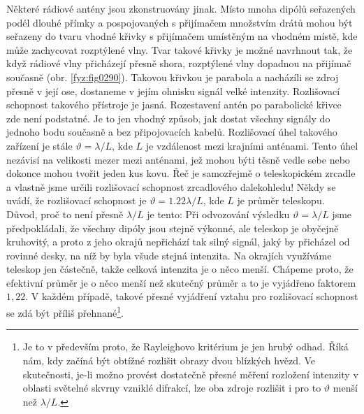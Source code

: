     Některé rádiové antény jsou zkonstruovány jinak. Místo mnoha dipólů seřazených podél dlouhé 
    přímky a pospojovaných s přijímačem množstvím drátů mohou být seřazeny do tvaru vhodné křivky s 
    přijímačem umístěným na vhodném místě, kde může zachycovat rozptýlené vlny. Tvar takové křivky 
    je možné navrhnout tak, že když rádiové vlny přicházejí přesně shora, rozptýlené vlny dopadnou 
    na přijímač současně (obr. \ref{fyz:fig0290}). Takovou křivkou je parabola a nacházíli se zdroj 
    přesně v její ose, dostaneme v jejím ohnisku signál velké intenzity. Rozlišovací schopnost 
    takového přístroje je jasná. Rozestavení antén po parabolické křivce zde není podstatné. Je to 
    jen vhodný způsob, jak dostat všechny signály do jednoho bodu současně a bez připojovacích 
    kabelů. Rozlišovací úhel takového zařízení je stále  \(\vartheta =  \lambda/L\), kde \(L\) je 
    vzdálenost mezi krajními anténami. Tento úhel nezávisí na velikosti mezer mezi anténami, jež 
    mohou býti těsně vedle sebe nebo dokonce mohou tvořit jeden kus kovu. Řeč je samozřejmě o 
    teleskopickém zrcadle a vlastně jsme určili rozlišovací schopnost zrcadlového dalekohledu! 
    Někdy se uvádí, že rozlišovací schopnost je \(\vartheta = \num{1.22}\lambda/L\), kde \(L\) je 
    průměr teleskopu. Důvod, proč to není přesně \(\lambda/L\) je tento: Při odvozování výsledku 
    \(\vartheta = \lambda/L\) jsme předpokládali, že všechny dipóly jsou stejně výkonné, ale 
    teleskop je obyčejně kruhovitý, a proto z jeho okrajů nepřichází tak silný signál, jaký by 
    přicházel od rovinné desky, na níž by byla všude stejná intenzita. Na okrajích využíváme 
    teleskop jen částečně, takže celková intenzita je o něco menší. Chápeme proto, že efektivní 
    průměr je o něco menší než skutečný průměr a to je vyjádřeno faktorem \(1,22\). V každém 
    případě, takové přesné vyjádření vztahu pro rozlišovací schopnost se zdá být příliš 
    přehnané\footnote{ Je to v především proto, že Rayleighovo kritérium je jen hrubý odhad. Říká 
    nám, kdy začíná být obtížné rozlišit obrazy dvou blízkých hvězd. Ve skutečnosti, je-li možno 
    provést dostatečně přesné měření rozložení intenzity v oblasti světelné skvrny vzniklé 
    difrakcí, lze oba zdroje rozlišit i pro to \(\vartheta\) menší než \(\lambda/L\).}.
    
